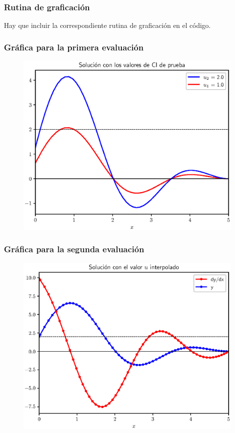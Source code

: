 \documentclass[12pt]{beamer}
\begin{document}
\begin{frame}
\frametitle{Rutina de graficación}
Hay que incluir la correspondiente rutina de graficación en el código.
\end{frame}
\begin{frame}
\frametitle{Gráfica para la primera evaluación}
\begin{figure}
    \centering
    \includegraphics[scale=0.55]{Imagenes/plot_Ejercicio_02_Metodo_Disparo_01.eps}
\end{figure}
\end{frame}
\begin{frame}
\frametitle{Gráfica para la segunda evaluación}
\begin{figure}
    \centering
    \includegraphics[scale=0.55]{Imagenes/plot_Ejercicio_02_Metodo_Disparo_02.eps}
\end{figure}
\end{frame}
\end{document}
